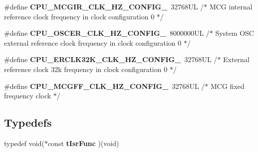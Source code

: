 \begin{DoxyCompactItemize}
\item 
\hypertarget{group___cpu__module_ga860e7441eac7d5e35385bcd62b019d9d}{\#define {\bfseries C\-P\-U\-\_\-\-M\-C\-G\-I\-R\-\_\-\-C\-L\-K\-\_\-\-H\-Z\-\_\-\-C\-O\-N\-F\-I\-G\-\_}~32768\-U\-L /$\ast$ M\-C\-G internal reference clock frequency in clock configuration 0 $\ast$/}\label{group___cpu__module_ga860e7441eac7d5e35385bcd62b019d9d}

\item 
\hypertarget{group___cpu__module_ga2960ebfe6475f475999ea8f1d5448483}{\#define {\bfseries C\-P\-U\-\_\-\-O\-S\-C\-E\-R\-\_\-\-C\-L\-K\-\_\-\-H\-Z\-\_\-\-C\-O\-N\-F\-I\-G\-\_}~8000000\-U\-L /$\ast$ System O\-S\-C external reference clock frequency in clock configuration 0 $\ast$/}\label{group___cpu__module_ga2960ebfe6475f475999ea8f1d5448483}

\item 
\hypertarget{group___cpu__module_ga092702a75fd1041eb311850abb022240}{\#define {\bfseries C\-P\-U\-\_\-\-E\-R\-C\-L\-K32\-K\-\_\-\-C\-L\-K\-\_\-\-H\-Z\-\_\-\-C\-O\-N\-F\-I\-G\-\_}~32768\-U\-L /$\ast$ External reference clock 32k frequency in clock configuration 0 $\ast$/}\label{group___cpu__module_ga092702a75fd1041eb311850abb022240}

\item 
\hypertarget{group___cpu__module_gafd8ec2ac4ea47574f95d0e5a6f80807e}{\#define {\bfseries C\-P\-U\-\_\-\-M\-C\-G\-F\-F\-\_\-\-C\-L\-K\-\_\-\-H\-Z\-\_\-\-C\-O\-N\-F\-I\-G\-\_}~32768\-U\-L /$\ast$ M\-C\-G fixed frequency clock $\ast$/}\label{group___cpu__module_gafd8ec2ac4ea47574f95d0e5a6f80807e}

\end{DoxyCompactItemize}
\subsection*{Typedefs}
\begin{DoxyCompactItemize}
\item 
\hypertarget{group___cpu__module_gabb511c0d4a17e764a053cf1b41d828e8}{typedef void($\ast$const {\bfseries t\-Isr\-Func} )(void)}\label{group___cpu__module_gabb511c0d4a17e764a053cf1b41d828e8}

\end{DoxyCompactItemize}
